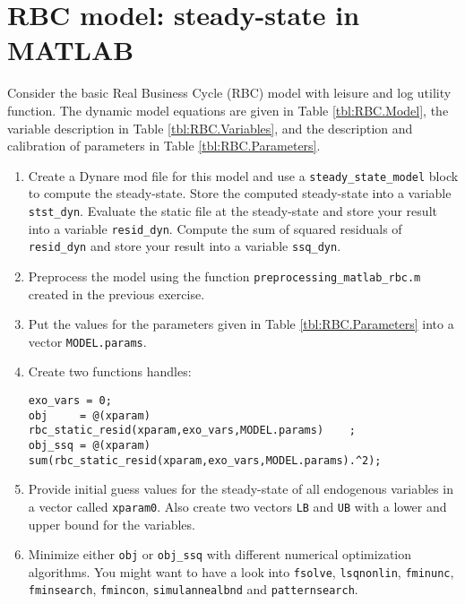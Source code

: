 \section[RBC model: steady-state in MATLAB]{RBC model: steady-state in MATLAB\label{ex:RBCModelSteadyMATLAB}}
Consider the basic Real Business Cycle (RBC) model with leisure and log utility function.
The dynamic model equations are given in Table \ref{tbl:RBC.Model},
  the variable description in Table \ref{tbl:RBC.Variables},
  and the description and calibration of parameters in Table \ref{tbl:RBC.Parameters}.

\begin{enumerate}

\item Create a Dynare mod file for this model and use a \texttt{steady\_state\_model} block to compute the steady-state.
Store the computed steady-state into a variable \texttt{stst\_dyn}.
Evaluate the static file at the steady-state and store your result into a variable \texttt{resid\_dyn}.
Compute the sum of squared residuals of \texttt{resid\_dyn} and store your result into a variable \texttt{ssq\_dyn}.

\item Preprocess the model using the function \texttt{preprocessing\_matlab\_rbc.m} created in the previous exercise.

\item Put the values for the parameters given in Table \ref{tbl:RBC.Parameters} into a vector \texttt{MODEL.params}.

\item Create two functions handles:
\begin{lstlisting}[style=Matlab-editor,basicstyle=\mlttfamily\scriptsize]
exo_vars = 0;
obj     = @(xparam)     rbc_static_resid(xparam,exo_vars,MODEL.params)    ;
obj_ssq = @(xparam) sum(rbc_static_resid(xparam,exo_vars,MODEL.params).^2);
\end{lstlisting} 

\item Provide initial guess values for the steady-state of all endogenous variables in a vector called \texttt{xparam0}.
Also create two vectors \texttt{LB} and \texttt{UB} with a lower and upper bound for the variables.

\item Minimize either \texttt{obj} or \texttt{obj\_ssq} with different numerical optimization algorithms.
You might want to have a look into \texttt{fsolve}, \texttt{lsqnonlin}, \texttt{fminunc}, \texttt{fminsearch}, \texttt{fmincon}, \texttt{simulannealbnd} and \texttt{patternsearch}.


\end{enumerate}
